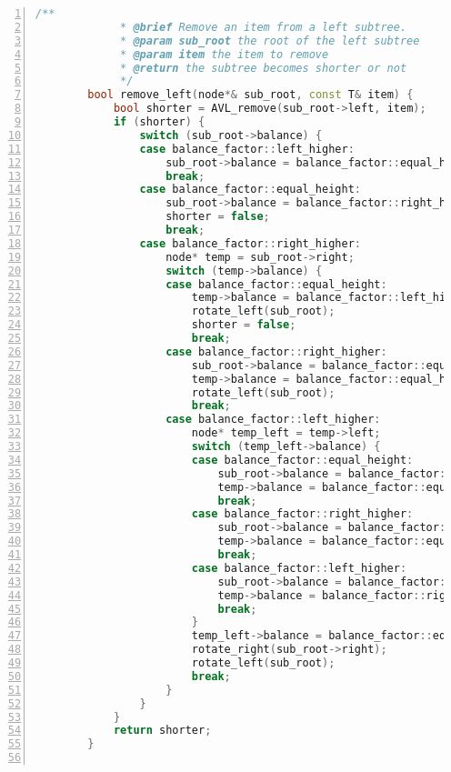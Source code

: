\documentclass{article}
\begin{document}
\begin{lstlisting}[xleftmargin = 2em,xrightmargin = 2em, aboveskip = 0.5em, numbers = left, language = C++]
        /**
    		 * @brief Remove an item from a left subtree.
    		 * @param sub_root the root of the left subtree
    		 * @param item the item to remove
    		 * @return the subtree becomes shorter or not
    		 */
        bool remove_left(node*& sub_root, const T& item) {
            bool shorter = AVL_remove(sub_root->left, item);
            if (shorter) {
                switch (sub_root->balance) {
                case balance_factor::left_higher:
                    sub_root->balance = balance_factor::equal_height;
                    break;
                case balance_factor::equal_height:
                    sub_root->balance = balance_factor::right_higher;
                    shorter = false;
                    break;
                case balance_factor::right_higher:
                    node* temp = sub_root->right;
                    switch (temp->balance) {
                    case balance_factor::equal_height:
                        temp->balance = balance_factor::left_higher;
                        rotate_left(sub_root);
                        shorter = false;
                        break;
                    case balance_factor::right_higher:
                        sub_root->balance = balance_factor::equal_height;
                        temp->balance = balance_factor::equal_height;
                        rotate_left(sub_root);
                        break;
                    case balance_factor::left_higher:
                        node* temp_left = temp->left;
                        switch (temp_left->balance) {
                        case balance_factor::equal_height:
                            sub_root->balance = balance_factor::equal_height;
                            temp->balance = balance_factor::equal_height;
                            break;
                        case balance_factor::right_higher:
                            sub_root->balance = balance_factor::left_higher;
                            temp->balance = balance_factor::equal_height;
                            break;
                        case balance_factor::left_higher:
                            sub_root->balance = balance_factor::equal_height;
                            temp->balance = balance_factor::right_higher;
                            break;
                        }
                        temp_left->balance = balance_factor::equal_height;
                        rotate_right(sub_root->right);
                        rotate_left(sub_root);
                        break;
                    }
                }
            }
            return shorter;
        }


\end{lstlisting}
\end{document}
